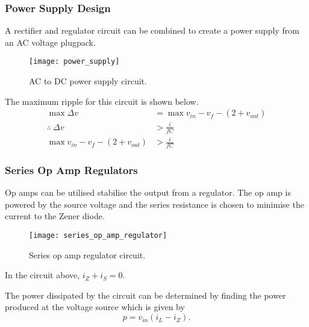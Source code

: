 \documentclass{article}
\begin{document}
\subsubsection{Power Supply Design}
A rectifier and regulator circuit can be combined to create a power supply from an AC voltage plugpack.
\begin{figure}[H]
    \centering
    \texttt{[image: power\_supply]}
    \caption{AC to DC power supply circuit.}
\end{figure}
The maximum ripple for this circuit is shown below.
\begin{align*}
    \max{\Delta v} & = \max{v_{in}} - v_f - \left( 2 + v_{out} \right) \\
    \therefore\: \Delta v & > \frac{i}{fC} \\
    \max{v_{in}} - v_f - \left( 2 + v_{out} \right) & > \frac{i}{fC}
\end{align*}
\subsubsection{Series Op Amp Regulators}
Op amps can be utilised stabilise the output from a regulator.
The op amp is powered by the source voltage and the series resistance is chosen to minimise the current to the Zener diode.
\begin{figure}[H]
    \centering
    \texttt{[image: series\_op\_amp\_regulator]}
    \caption{Series op amp regulator circuit.}
\end{figure}
In the circuit above, $i_Z + i_S = 0$.

The power dissipated by the circuit can be determined by finding the power produced at the voltage source
which is given by
\begin{equation*}
    p = v_{in} \left( i_L - i_Z \right).
\end{equation*}
\end{document}
